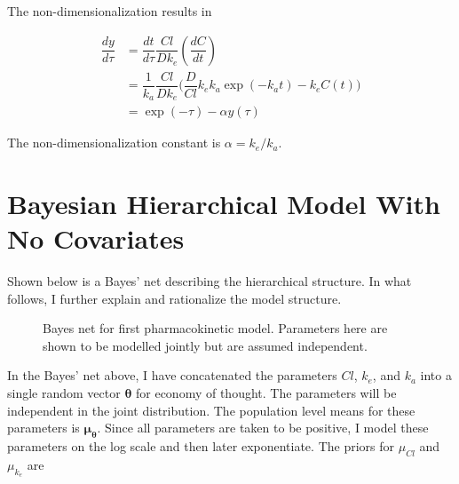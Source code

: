 \documentclass[12pt,a4paper]{book}
\begin{document}
\noindent The non-dimensionalization results in

\begin{align}
\dfrac{dy}{d\tau} &= \dfrac{dt}{d\tau}\dfrac{Cl}{Dk_e} \left(\dfrac{dC}{dt}\right)\\
 &=\dfrac{1}{k_a}\dfrac{Cl}{Dk_e}\Big(\dfrac{D}{Cl}k_ek_a\exp(-k_at) - k_eC(t)\Big)\\
&= \exp(-\tau) - \alpha y(\tau)
\end{align}

\noindent  The non-dimensionalization constant is $ \alpha=k_e/k_a $.



\section{Bayesian Hierarchical Model With No Covariates}

Shown below is a Bayes' net describing the hierarchical structure.  In what follows, I further explain and rationalize the model structure.


\begin{figure}[h!]
	\centering
	\caption{Bayes net for first pharmacokinetic model.  Parameters here are shown to be modelled jointly but are assumed independent.}
	\label{model_2}
\end{figure}

In the Bayes' net above, I have concatenated the parameters $ Cl $, $ k_e $, and $ k_a $ into a single random vector $ \bm{\theta} $ for economy of thought.  The parameters will be independent in the joint distribution.  The population level means for these parameters is $\bm{\mu_{\theta}}$.  Since all parameters are taken to be positive, I model these parameters on the log scale and then later exponentiate. The priors for $ \mu_{Cl} $ and $ \mu_{k_e} $ are
\end{document}

